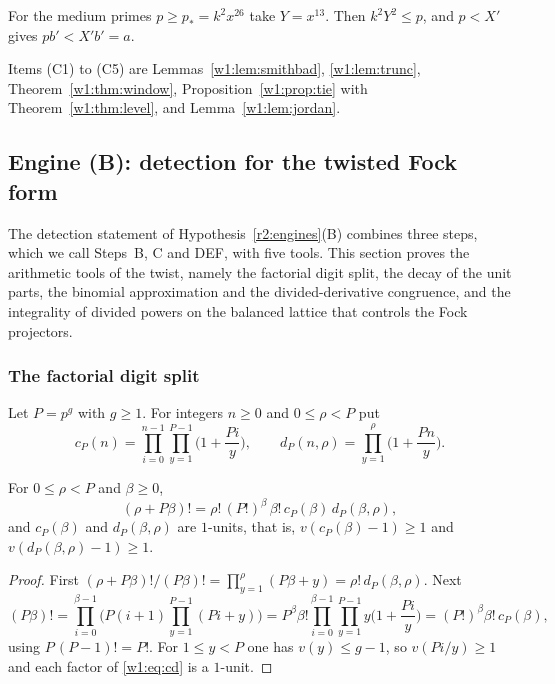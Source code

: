 For the medium primes $p\ge p_*=k^2x^{26}$ take $Y=x^{13}$. Then $k^2Y^2\le p$, and $p<X'$ gives $pb'<X'b'=a$.



Items (C1) to (C5) are Lemmas~\ref{w1:lem:smithbad}, \ref{w1:lem:trunc}, Theorem~\ref{w1:thm:window}, Proposition~\ref{w1:prop:tie} with Theorem~\ref{w1:thm:level}, and Lemma~\ref{w1:lem:jordan}.

\subsection{Engine (B): detection for the twisted Fock form}\label{w1:sec:B}

The detection statement of Hypothesis~\ref{r2:engines}(B) combines three steps, which we call Steps~B, C and DEF, with five tools. This section proves the arithmetic tools of the twist, namely the factorial digit split, the decay of the unit parts, the binomial approximation and the divided-derivative congruence, and the integrality of divided powers on the balanced lattice that controls the Fock projectors.

\subsubsection{The factorial digit split}

Let $P=p^g$ with $g\ge1$. For integers $n\ge0$ and $0\le\rho<P$ put
\begin{equation}\label{w1:eq:cd}
c_P(n)=\prod_{i=0}^{n-1}\prod_{y=1}^{P-1}\Big(1+\frac{Pi}y\Big),\qquad d_P(n,\rho)=\prod_{y=1}^{\rho}\Big(1+\frac{Pn}y\Big).
\end{equation}

\begin{proposition}\label{w1:prop:digitsplit}
For $0\le\rho<P$ and $\beta\ge0$,
\[
(\rho+P\beta)!=\rho!\,(P!)^\beta\,\beta!\,c_P(\beta)\,d_P(\beta,\rho),
\]
and $c_P(\beta)$ and $d_P(\beta,\rho)$ are $1$-units, that is, $v(c_P(\beta)-1)\ge1$ and $v(d_P(\beta,\rho)-1)\ge1$.
\end{proposition}

\begin{proof}
First $(\rho+P\beta)!/(P\beta)!=\prod_{y=1}^\rho(P\beta+y)=\rho!\,d_P(\beta,\rho)$. Next
\[
(P\beta)!=\prod_{i=0}^{\beta-1}\Big(P(i+1)\prod_{y=1}^{P-1}(Pi+y)\Big)=P^\beta\beta!\prod_{i=0}^{\beta-1}\prod_{y=1}^{P-1}y\Big(1+\frac{Pi}y\Big)=(P!)^\beta\beta!\,c_P(\beta),
\]
using $P\,(P-1)!=P!$. For $1\le y<P$ one has $v(y)\le g-1$, so $v(Pi/y)\ge1$ and each factor of \eqref{w1:eq:cd} is a $1$-unit.
\end{proof}

